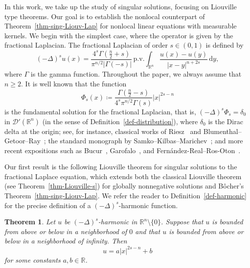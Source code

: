 \documentclass[11pt]{amsart}
\theoremstyle{plain}
\newtheorem{theorem}{Theorem}[section]
\theoremstyle{definition}
\numberwithin{equation}{section}
\begin{document}
In this work, we take up the study of singular solutions, focusing on Liouville type theorems. Our goal is to establish the nonlocal counterpart of Theorem~\ref{thm-sing-Liouv-Lap} for nonlocal linear equations with measurable kernels. We begin with the simplest case, where the operator is given by the fractional Laplacian. The fractional Laplacian of order $s \in (0,1)$ is defined by
\begin{equation*}
(-\Delta)^s u(x) = \frac{4^{s}\Gamma(\frac{n}{2}+s)}{\pi^{n/2}|\Gamma(-s)|} \,\mathrm{p.v.} \int_{\mathbb{R}^n} \frac{u(x)-u(y)}{|x-y|^{n+2s}} \,\mathrm{d}y,
\end{equation*}
where $\Gamma$ is the gamma function. Throughout the paper, we always assume that $n \geq 2$. It is well known that the function
\begin{equation}\label{eq-FS}
\Phi_s(x) \coloneqq \frac{\Gamma(\frac{n}{2}-s)}{4^{s}\pi^{n/2}\Gamma(s)} |x|^{2s-n}
\end{equation}
is the fundamental solution for the fractional Laplacian, that is, $(-\Delta)^s\Phi_s = \delta_0$ in $\mathscr{D}'(\mathbb{R}^n)$ (in the sense of Definition~\ref{def-distribution}), where $\delta_0$ is the Dirac delta at the origin; see, for instance, classical works of Riesz~\cite{Rie49} and Blumenthal--Getoor--Ray~\cite{BGR61}; the standard monograph by Samko--Kilbas--Marichev~\cite{SKM93}; and more recent expositions such as Bucur~\cite[Theorem~2.3]{Buc16}, Garofalo~\cite[Theorem~8.4]{Gar19}, and Fern\'andez-Real--Ros-Oton~\cite[Lemma~1.10.9]{FRRO24}.

Our first result is the following Liouville theorem for singular solutions to the fractional Laplace equation, which extends both the classical Liouville theorem (see Theorem~\ref{thm-Liouville-s}) for globally nonnegative solutions and B\^ocher's Theorem~\ref{thm-sing-Liouv-Lap}. We refer the reader to Definition~\ref{def-harmonic} for the precise definition of a $(-\Delta)^s$-harmonic function.

\begin{theorem}\label{thm-sing-Liouv-s}
Let $u$ be $(-\Delta)^s$-harmonic in $\mathbb{R}^n \setminus \{0\}$. Suppose that $u$ is bounded from above or below in a neighborhood of $0$ and that $u$ is bounded from above or below in a neighborhood of infinity. Then
\begin{equation*}
u=a|x|^{2s-n}+b
\end{equation*}
for some constants $a, b \in \mathbb{R}$.
\end{theorem}
\end{document}
